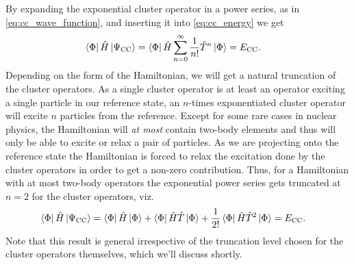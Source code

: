         By expanding the exponential cluster operator in a power series, as in
        \autoref{eq:cc_wave_function}, and inserting it into
        \autoref{eq:cc_energy} we get
        \begin{align}
            \bra{\Phi}\hat{H} \ket{\Psi_{\text{CC}}}
            &=
            \bra{\Phi}\hat{H}
            \sum_{n = 0}^{\infty} \frac{1}{n!}\hat{T}^n
            \ket{\Phi}
            = E_{\text{CC}}.
        \end{align}
        Depending on the form of the Hamiltonian, we will get a natural
        truncation of the cluster operators.
        As a single cluster operator is at
        least an operator exciting a single particle in our reference state, an
        $n$-times exponentiated cluster operator will excite $n$ particles from
        the reference.
        Except for some rare cases in nuclear physics,
        the Hamiltonian will \emph{at most} contain two-body elements and thus
        will only be able to excite or relax a pair of particles.
        As we are projecting onto the reference state the Hamiltonian is forced
        to relax the excitation done by the cluster operators in order to get a
        non-zero contribution.
        Thus, for a Hamiltonian with at most two-body operators the exponential
        power series gets truncated at $n = 2$ for the cluster operators, viz.
        \begin{align}
            \bra{\Phi}\hat{H} \ket{\Psi_{\text{CC}}}
            &=
            \bra{\Phi}\hat{H}\ket{\Phi}
            + \bra{\Phi}\hat{H} \hat{T} \ket{\Phi}
            + \frac{1}{2!}
            \bra{\Phi} \hat{H} \hat{T}^2 \ket{\Phi}
            = E_{\text{CC}}.
        \end{align}
        Note that this result is general irrespective of the truncation level
        chosen for the cluster operators themselves, which we'll discuss
        shortly.

